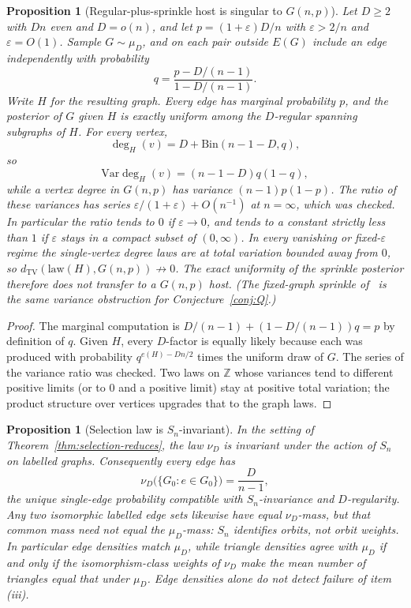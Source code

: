 \documentclass[11pt]{article}
\newtheorem{proposition}[theorem]{Proposition}
\newcommand{\Var}{\mathrm{Var}}
\newcommand{\dTV}{d_{\mathrm{TV}}}
\begin{document}
\begin{proposition}[Regular-plus-sprinkle host is singular to \(G(n,p)\)]
\label{prop:sprinkle-posterior-gap}
Let \(D\ge 2\) with \(Dn\) even and \(D=o(n)\), and let
\(p=(1+\varepsilon)D/n\) with \(\varepsilon>2/n\) and \(\varepsilon=O(1)\).
Sample \(G\sim\mu_D\), and on each pair outside \(E(G)\) include an edge
independently with probability
\[
q
=
\frac{p-D/(n-1)}{1-D/(n-1)}.
\]
Write \(H\) for the resulting graph.
Every edge has marginal probability \(p\), and the posterior of \(G\) given
\(H\) is exactly uniform among the \(D\)-regular spanning subgraphs of \(H\).
For every vertex,
\[
\deg_H(v)=D+\mathrm{Bin}(n-1-D,q),
\]
so
\[
\Var\deg_H(v)=(n-1-D)q(1-q),
\]
while a vertex degree in \(G(n,p)\) has variance \((n-1)p(1-p)\).
The ratio of these variances has series \(\varepsilon/(1+\varepsilon)+O(n^{-1})\) at
\(n=\infty\), which was checked.
In particular the ratio tends to \(0\) if \(\varepsilon\to 0\), and tends to a
constant strictly less than \(1\) if \(\varepsilon\) stays in a compact subset of
\((0,\infty)\).
In every vanishing or fixed-\(\varepsilon\) regime the single-vertex degree laws are
at total variation bounded away from \(0\), so
\(\dTV(\mathrm{law}(H),G(n,p))\not\to 0\).
The exact uniformity of the sprinkle posterior therefore does not transfer
to a \(G(n,p)\) host.
(The fixed-graph sprinkle of~\cite{PlusOneV1} is the same variance
obstruction for Conjecture~\ref{conj:Q}.)
\end{proposition}

\begin{proof}
The marginal computation is
\(D/(n-1)+(1-D/(n-1))q=p\) by definition of \(q\).
Given \(H\), every \(D\)-factor is equally likely because each was produced
with probability \(q^{e(H)-Dn/2}\) times the uniform draw of \(G\).
The series of the variance ratio was checked.
Two laws on \(\mathbb Z\) whose variances tend to different positive limits
(or to \(0\) and a positive limit) stay at positive total variation; the
product structure over vertices upgrades that to the graph laws.
\end{proof}

\begin{proposition}[Selection law is \(S_n\)-invariant]
\label{prop:nu-sn}
In the setting of Theorem~\ref{thm:selection-reduces}, the law \(\nu_D\) is
invariant under the action of \(S_n\) on labelled graphs.
Consequently every edge has
\[
\nu_D\bigl(\{G_0:e\in G_0\}\bigr)
=
\frac{D}{n-1},
\]
the unique single-edge probability compatible with \(S_n\)-invariance and
\(D\)-regularity.
Any two isomorphic labelled edge sets likewise have equal \(\nu_D\)-mass, but
that common mass need not equal the \(\mu_D\)-mass: \(S_n\) identifies orbits,
not orbit weights.
In particular edge densities match \(\mu_D\), while triangle densities agree
with \(\mu_D\) if and only if the isomorphism-class weights of \(\nu_D\) make the
mean number of triangles equal that under \(\mu_D\).
Edge densities alone do not detect failure of item (iii).
\end{proposition}
\end{document}
